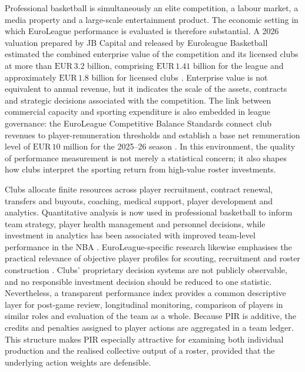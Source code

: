 \documentclass[pdflatex,sn-mathphys-num]{sn-jnl}
\begin{document}
Professional basketball is simultaneously an elite competition, a labour market, a media property and a large-scale entertainment product. The economic setting in which EuroLeague performance is evaluated is therefore substantial. A 2026 valuation prepared by JB Capital and released by Euroleague Basketball estimated the combined enterprise value of the competition and its licensed clubs at more than \(\mathrm{EUR}\,3.2\) billion, comprising \(\mathrm{EUR}\,1.41\) billion for the league and approximately \(\mathrm{EUR}\,1.8\) billion for licensed clubs \cite{EuroleagueValuation2026}. Enterprise value is not equivalent to annual revenue, but it indicates the scale of the assets, contracts and strategic decisions associated with the competition. The link between commercial capacity and sporting expenditure is also embedded in league governance: the EuroLeague Competitive Balance Standards connect club revenues to player-remuneration thresholds and establish a base net remuneration level of \(\mathrm{EUR}\,10\) million for the 2025--26 season \cite{EuroleagueCBS2025}. In this environment, the quality of performance measurement is not merely a statistical concern; it also shapes how clubs interpret the sporting return from high-value roster investments.

Clubs allocate finite resources across player recruitment, contract renewal, transfers and buyouts, coaching, medical support, player development and analytics. Quantitative analysis is now used in professional basketball to inform team strategy, player health management and personnel decisions, while investment in analytics has been associated with improved team-level performance in the NBA \cite{TernerFranks2021,WangSarkerHosoi2025}. EuroLeague-specific research likewise emphasises the practical relevance of objective player profiles for scouting, recruitment and roster construction \cite{PaulauskasEtAl2024}. Clubs' proprietary decision systems are not publicly observable, and no responsible investment decision should be reduced to one statistic. Nevertheless, a transparent performance index provides a common descriptive layer for post-game review, longitudinal monitoring, comparison of players in similar roles and evaluation of the team as a whole. Because PIR is additive, the credits and penalties assigned to player actions are aggregated in a team ledger. This structure makes PIR especially attractive for examining both individual production and the realised collective output of a roster, provided that the underlying action weights are defensible.
\end{document}
